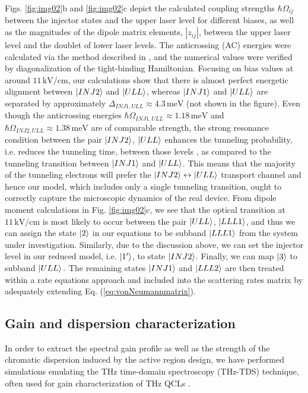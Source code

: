 \documentclass[10pt,letterpaper]{article}%
\begin{document}
Figs. \ref{fig:img02}b and \ref{fig:img02}c depict the calculated coupling
strengths $\hbar\Omega_{ij}$ between the injector states and the upper laser
level for different biases, as well as the magnitudes of the dipole matrix
elements, $\left| z_{ij}\right|  $, between the upper laser level and the
doublet of lower laser levels. The anticrossing (AC) energies were calculated via
the method described in \cite{bastardwave}, and the numerical values were
verified by diagonalization of the tight-binding Hamiltonian. Focusing on bias
values at around $11{\,}\mathrm{kV}/\mathrm{cm}$, our calculations show that
there is almost perfect energetic alignment between $\Ket{INJ2}\ $and
$\Ket{ULL}$, whereas $\Ket{INJ1}$ and $\Ket{ULL}$ are separated by
approximately $\Delta_{INJ1,ULL}\approx4.3{\,}\mathrm{meV}$ (not shown in the
figure). Even though the anticrossing energies $\hbar\Omega_{INJ1,ULL}%
\approx1.18{\,}\mathrm{meV}$ and $\hbar\Omega_{INJ2,ULL}\approx1.38{\,}%
\mathrm{meV}$ are of comparable strength, the strong resonance condition
between the pair $\Ket{INJ2}$, $\Ket{ULL}$ enhances the tunneling probability,
i.e. reduces the tunneling time, between those levels
\cite{williams2007terahertz}, as compared to the tunneling transition between
$\Ket{INJ1}$ and $\Ket{ULL}$. This means that the majority of the tunneling
electrons will prefer the $\Ket{INJ2}\leftrightarrow\Ket{ULL}$ transport
channel and hence our model, which includes only a single tunneling
transition, ought to correctly capture the microscopic dynamics of the real
device. From dipole moment calculations in Fig. \ref{fig:img02}c, we see that
the optical transition at $11{\,}\mathrm{kV}/\mathrm{cm}$ is most likely to
occur between the pair $\Ket{ULL}$, $\Ket{LLL1}$, and thus we can assign the
state $\Ket{2}$ in our equations to be subband $\Ket{LLL1}$ from the system
under investigation. Similarly, due to the discussion above, we can set the
injector level in our reduced model, i.e. $\Ket{1'}$, to state $\Ket{INJ2}$.
Finally, we can map $\Ket{3}$ to subband $\Ket{ULL}.$ The remaining states
$\Ket{INJ1}$ and $\Ket{LLL2}$ are then treated within a rate equations
approach and included into the scattering rates matrix by adequately extending
Eq. (\ref{eq:vonNeumannmatrix}).

\subsection{Gain and dispersion characterization}

\label{subsec:numthztds} In order to extract the spectral gain profile as well
as the strength of the chromatic dispersion induced by the active region
design, we have performed simulations emulating the THz time-domain
spectroscopy (THz-TDS) technique, often used for gain characterization of THz
QCLs \cite{burghoff2014broadband,jukam2008gain,martl2011gain}.
\end{document}
